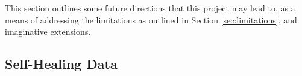 This section outlines some future directions that this project may lead to, as a means of addressing the limitations as outlined in Section \cref{sec:limitations}, and imaginative extensions.

\subsection{Self-Healing Data}

